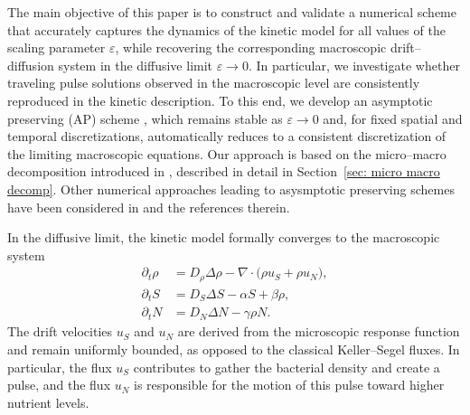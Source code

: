 \documentclass[11pt,twoside]{article}
\numberwithin{equation}{section}
\theoremstyle{plain}
\theoremstyle{nonumberplain}
\begin{document}
 The main objective of this paper is to construct and validate a numerical scheme that accurately captures the dynamics of the kinetic model for all values of the scaling parameter $\varepsilon$, while recovering the corresponding macroscopic drift--diffusion system in the diffusive limit $\varepsilon \to 0$. In particular, we investigate whether traveling pulse solutions observed in the macroscopic level are consistently reproduced in the kinetic description. To this end, we develop an asymptotic preserving (AP) scheme \cite{filbet2010class,jin1999efficient}, which remains stable as $\varepsilon \to 0$ and, for fixed spatial and temporal discretizations, automatically reduces to a consistent discretization of the limiting macroscopic equations. Our approach is based on the micro--macro decomposition introduced in \cite{lemou2008new}, described in detail in Section~\ref{sec: micro macro decomp}. Other numerical approaches leading to asysmptotic preserving schemes have been considered in \cite{CY13,LWZ18,CKLO19} and the references therein.

In the diffusive limit, the kinetic model formally converges to the macroscopic system
\begin{subequations}
\label{basicmodel}
\begin{align}
\partial_t \rho
&= D_\rho \Delta \rho
   - \nabla \cdot \bigl( \rho u_S + \rho u_N \bigr), \\
\partial_t S
&= D_S \Delta S - \alpha S + \beta \rho, \\
\partial_t N
&= D_N \Delta N - \gamma \rho N.
\end{align}
\end{subequations}
The drift velocities $u_S$ and $u_N$ are derived from the microscopic response function
and remain uniformly bounded, as opposed to the classical Keller--Segel fluxes.
In particular, the flux $u_S$ contributes to gather the bacterial density and create a pulse, and the flux $u_N$ is responsible for the motion of this pulse toward higher nutrient levels.
\end{document}
